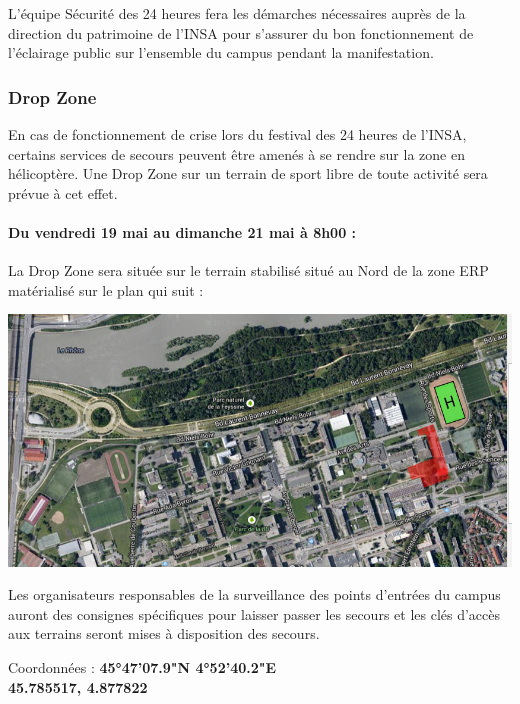 \documentclass[hidelinks, paper=a4, fontsize=13pt]{report}
\begin{document}
L’équipe Sécurité des 24 heures fera les démarches nécessaires auprès de la direction du patrimoine de l’INSA pour s’assurer du bon fonctionnement de l’éclairage public sur l’ensemble du campus pendant la manifestation.


\subsubsection{Drop Zone}



En cas de fonctionnement de crise lors du festival des 24 heures de l’INSA, certains services de secours peuvent être amenés à se rendre sur la zone en hélicoptère. 
Une Drop Zone sur un terrain de sport libre de toute activité sera prévue à cet effet. 

\paragraph{Du vendredi 19 mai au dimanche 21 mai à 8h00 :}

La Drop Zone sera située sur le terrain stabilisé situé au Nord de la zone ERP matérialisé sur le plan qui suit :

\begin{center}
	\includegraphics[scale=0.4]{Annexes/Plans/dropZone}
\end{center}

Les organisateurs responsables de la surveillance des points d’entrées du campus auront des consignes spécifiques pour laisser passer les secours et les clés d’accès aux terrains seront mises à disposition des secours.

\begin{center}
	Coordonnées : \textbf{45°47'07.9"N 4°52'40.2"E}\\
	\textbf{45.785517, 4.877822}
\end{center}
\end{document}

